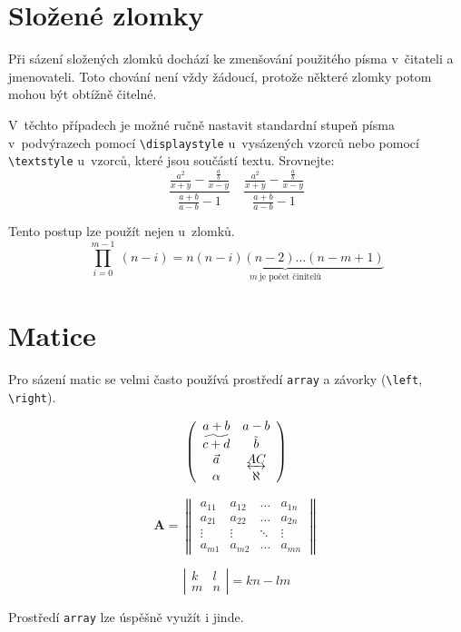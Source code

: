 \documentclass[11pt,a4paper,titlepage,twocolumn]{article}
\theoremstyle{definition}
\begin{document}
\section{Složené zlomky}
	Při sázení složených zlomků dochází ke zmenšování použitého písma v~čitateli a jmenovateli. Toto chování 
	není vždy žádoucí, protože některé zlomky potom mohou být obtížně čitelné. 

	V~těchto případech je možné ručně nastavit standardní stupeň písma v~podvýrazech pomocí \verb|\displaystyle| 
	u~vysázených vzorců nebo pomocí \verb|\textstyle| u~vzorců, 
	které jsou součástí textu. Srovnejte:
	$$\frac{\textstyle\frac{a^2}{x+y}-\textstyle\frac{\scriptstyle\frac{a}{b}}{x-y}}{\textstyle\frac{a+b}{a-b}-1} \quad  
	\frac{\displaystyle\frac{a^2}{x+y}-\displaystyle\frac{\displaystyle\frac{a}{b}}{x-y}}{\displaystyle\frac{a+b}{a-b}-1}$$
	
	Tento postup lze použít nejen u~zlomků.
	$$\prod_{i=0}^{m-1}\ (n-i) = \underbrace{n(n-i)(n-2) \ldots (n-m+1)}_{\displaystyle{m}\ \mbox{je počet činitelů}}$$ 

\section{Matice}
	Pro sázení matic se velmi často používá prostředí \texttt{array} a závorky (\verb|\left|, \verb|\right|).

	$$\left(
			\begin{array}{ccc}
				a+b & a-b \\
				\widetilde{c+d} & \tilde{b}   \\
				\vec{a} & \underleftrightarrow{AC}   \\
				\alpha & \aleph  
			\end{array}
		\right)$$

	$$\mathbf{A}=\left\|
			\begin{array}{cccc}
				a_{11} & a_{12} & \ldots & a_{1n} \\
				a_{21} & a_{22} & \ldots & a_{2n} \\
				\vdots & \vdots & \ddots & \vdots \\
				a_{m1} & a_{m2} & \ldots & a_{mn}
			\end{array}
		\right\|$$

	$$\left|
			\begin{array}{cc}
				k & l \\
				m & n 
			\end{array}
		\right| =kn-lm$$

	Prostředí \texttt{array} lze úspěšně využít i jinde.
\end{document}
